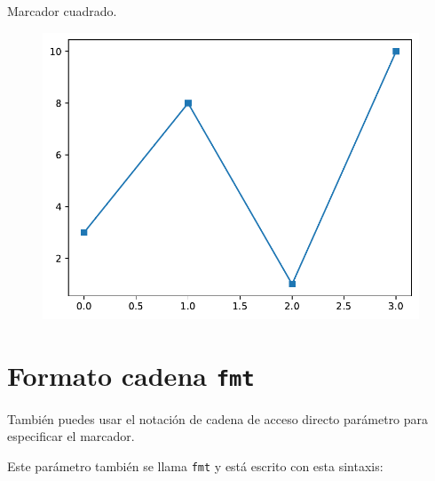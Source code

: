 \begin{code} Marcador cuadrado.
\begin{Shaded}
\begin{Highlighting}[]
\OperatorTok{=} \NormalTok{)}
\end{Highlighting}
\end{Shaded}

\begin{figure}
  \centering
  \includegraphics[scale=0.6]{img/grafica1008.pdf}
\end{figure}
\end{code}

\section{\texorpdfstring{Formato cadena \texttt{fmt}}{Formato cadena fmt}}

También puedes usar el notación de cadena de acceso directo parámetro
para especificar el marcador.

Este parámetro también se llama \texttt{fmt} y está escrito con esta
sintaxis:

\begin{Shaded}
\begin{Highlighting}[]
\OperatorTok{|}\OperatorTok{|}

\end{Highlighting}
\end{Shaded}

